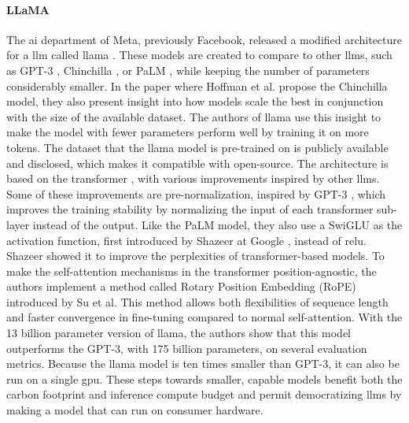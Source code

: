     \paragraph{LLaMA\\}
    The \gls{ai} department of Meta, previously Facebook, released a modified architecture for a \gls{llm} called \gls{llama} \cite{touvronLLaMAOpenEfficient2023}.
    These models are created to compare to other \glspl{llm}, such as GPT-3 \cite{brownLanguageModelsAre2020}, Chinchilla \cite{hoffmannTrainingComputeOptimalLarge2022}, or PaLM \cite{chowdheryPaLMScalingLanguage2022}, while keeping the number of parameters considerably smaller. In the paper where Hoffman et al. propose the Chinchilla model, they also present insight into how models scale the best in conjunction with the size of the available dataset. The authors of \gls{llama} use this insight to make the model with fewer parameters perform well by training it on more tokens. The dataset that the \gls{llama} model is pre-trained on is publicly available and disclosed, which makes it compatible with open-source. The architecture is based on the transformer \cite{vaswaniAttentionAllYou2017}, with various improvements inspired by other \glspl{llm}. Some of these improvements are pre-normalization, inspired by GPT-3 \cite{brownLanguageModelsAre2020}, which improves the training stability by normalizing the input of each transformer sub-layer instead of the output. Like the PaLM model, they also use a SwiGLU as the activation function, first introduced by Shazeer at Google \cite{shazeerGLUVariantsImprove2020}, instead of \gls{relu}. Shazeer showed it to improve the perplexities of transformer-based models. To make the self-attention mechanisms in the transformer position-agnostic, the authors implement a method called Rotary Position Embedding (RoPE) introduced by Su et al. This method allows both flexibilities of sequence length and faster convergence in fine-tuning compared to normal self-attention. With the 13 billion parameter version of \gls{llama}, the authors show that this model outperforms the GPT-3, with 175 billion parameters, on several evaluation metrics. Because the \gls{llama} model is ten times smaller than GPT-3, it can also be run on a single \gls{gpu}. These steps towards smaller, capable models benefit both the carbon footprint and inference compute budget and permit democratizing \glspl{llm} by making a model that can run on consumer hardware.

